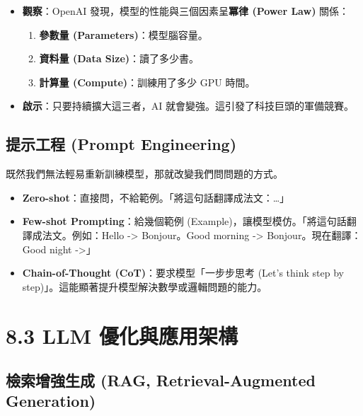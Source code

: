 \documentclass[
  letterpaper,
  DIV=11,
  numbers=noendperiod]{scrreprt}
\providecommand{\tightlist}{%
  \setlength{\itemsep}{0pt}\setlength{\parskip}{0pt}}
\begin{document}
\begin{itemize}
\tightlist
\item
  \textbf{觀察}：OpenAI 發現，模型的性能與三個因素呈\textbf{冪律 (Power
  Law)} 關係：

  \begin{enumerate}
  \def\labelenumi{\arabic{enumi}.}
  \tightlist
  \item
    \textbf{參數量 (Parameters)}：模型腦容量。
  \item
    \textbf{資料量 (Data Size)}：讀了多少書。
  \item
    \textbf{計算量 (Compute)}：訓練用了多少 GPU 時間。
  \end{enumerate}
\item
  \textbf{啟示}：只要持續擴大這三者，AI
  就會變強。這引發了科技巨頭的軍備競賽。
\end{itemize}

\section{提示工程 (Prompt Engineering)}\label{sec-prompt-engineering}

既然我們無法輕易重新訓練模型，那就改變我們問問題的方式。

\begin{itemize}
\tightlist
\item
  \textbf{Zero-shot}：直接問，不給範例。「將這句話翻譯成法文：\ldots」
\item
  \textbf{Few-shot Prompting}：給幾個範例
  (Example)，讓模型模仿。「將這句話翻譯成法文。例如：Hello
  -\textgreater{} Bonjour。Good morning -\textgreater{}
  Bonjour。現在翻譯：Good night -\textgreater」
\item
  \textbf{Chain-of-Thought (CoT)}：要求模型「一步步思考 (Let's think
  step by step)」。這能顯著提升模型解決數學或邏輯問題的能力。
\end{itemize}

\chapter{8.3 LLM 優化與應用架構}\label{sec-llm-optimization}

\section{檢索增強生成 (RAG, Retrieval-Augmented
Generation)}\label{sec-rag}
\end{document}
